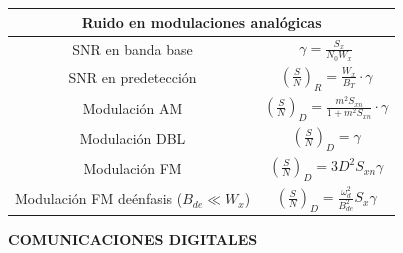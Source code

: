 \documentclass[es]{article}
\begin{document}
\begin{center}
  


    \renewcommand{\arraystretch}{1}
    \vspace{0.5cm}
    \renewcommand{\arraystretch}{1.5}
    \begin{tabular}{|c|c|}
        \multicolumn{2}{c}{{\bf Ruido en modulaciones analógicas }} \\
        \hline
        SNR en banda base & $\gamma = \displaystyle\frac{S_x}{N_0 W_x}$ \\
        \hline
        SNR en predetección &  $\left ( \displaystyle\frac{S}{N} \right )_R = \displaystyle\frac{W_x}{B_T} \cdot \gamma $\\
        \hline
        Modulación AM & $\left ( \displaystyle\frac{S}{N} \right )_D = \displaystyle\frac{m^2 S_{xn}}{1 + m^2 S_{xn}} \cdot \gamma $ \\
        \hline 
        Modulación DBL & $\left ( \displaystyle\frac{S}{N} \right )_D = \gamma $ \\
        \hline
        Modulación FM & $\left ( \displaystyle\frac{S}{N} \right )_D = 3D^2 S_{xn}\gamma$ \\    
        \hline
        Modulación FM deénfasis ($B_{de} \ll W_x$) & $\left ( \displaystyle\frac{S}{N} \right )_D = \displaystyle\frac{\omega_d^2}{B_{de}^2} S_x \gamma$ \\
        \hline
    \end{tabular}      
    \renewcommand{\arraystretch}{1}
    \vspace{0.5cm}


    \newpage

    {\bf COMUNICACIONES DIGITALES}


\end{center}
\end{document}
